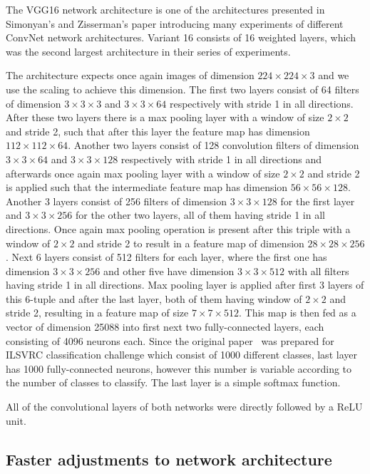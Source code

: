 The VGG16 network architecture is one of the architectures presented in Simonyan's and Zisserman's paper introducing many experiments of different ConvNet network architectures. Variant 16 consists of 16 weighted layers, which was the second largest architecture in their series of experiments.

The architecture expects once again images of dimension $224\times224\times3$ and we use the scaling to achieve this dimension. The first two layers consist of 64 filters of dimension $3\times3\times3$ and $3\times3\times64$ respectively with stride 1 in all directions. After these two layers there is a max pooling layer with a window of size $2\times2$ and stride 2, such that after this layer the feature map has dimension $112\times112\times64$. Another two layers consist of 128 convolution filters of dimension $3\times3\times64$ and $3\times3\times128$ respectively with stride 1 in all directions and afterwards once again max pooling layer with a window of size $2\times2$ and stride 2 is applied such that the intermediate feature map has dimension $56\times56\times128$. Another 3 layers consist of 256 filters of dimension $3\times3\times128$ for the first layer and $3\times3\times256$ for the other two layers, all of them having stride 1 in all directions. Once again max pooling operation is present after this triple with a window of $2\times2$ and stride 2 to result in a feature map of dimension $28\times28\times256$. Next 6 layers consist of 512 filters for each layer, where the first one has dimension $3\times3\times256$ and other five have dimension $3\times3\times512$ with all filters having stride 1 in all directions. Max pooling layer is applied after first 3 layers of this 6-tuple and after the last layer, both of them having window of $2\times2$ and stride 2, resulting in a feature map of size $7\times7\times512$. This map is then fed as a vector of dimension 25088 into first next two fully-connected layers, each consisting of 4096 neurons each. Since the original paper~\cite{vgg16} was prepared for ILSVRC classification challenge which consist of 1000 different classes, last layer has 1000 fully-connected neurons, however this number is variable according to the number of classes to classify. The last layer is a simple softmax function.

All of the convolutional layers of both networks were directly followed by a ReLU unit.

\subsection{Faster \rcnn{} adjustments to network architecture} \label{rcnnarch}

